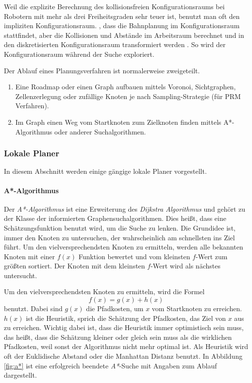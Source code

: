 Weil die explizite Berechnung des kollisionsfreien Konfigurationsraums bei Robotern mit mehr als drei Freiheitsgraden sehr teuer ist, benutzt man oft den impliziten Konfigurationsraum.
\Dh, dass die Bahnplanung im Konfigurationsraum stattfindet, aber die Kollisionen und Abstände im Arbeitsraum berechnet und in den diskretisierten Konfigurationsraum transformiert werden \citep{innoKonz}.
So wird der Konfigurationsraum während der Suche exploriert.

Der Ablauf eines Planungsverfahren ist normalerweise zweigeteilt\cite{Russell2003}.
\begin{enumerate}
\item Eine Roadmap oder einen Graph aufbauen mittels \gls{Voronoi},
 \gls{Sichtgraphen}, \gls{Zellenzerlegung} oder zufällige Knoten je nach
 Sampling-Strategie (\zB für \gls{PRM} Verfahren\cite{Thrun2005}).
\item Im Graph einen Weg vom Startknoten zum Zielknoten finden mittels A*-Algorithmus oder anderer Suchalgorithmen.
\end{enumerate}

\subsubsection{Lokale Planer}
\label{bahnplanung_lokale_planer_sec}

In diesem Abschnitt werden einige gängige lokale Planer vorgestellt.

\paragraph{A*-Algorithmus} 

Der \textit{A*-Algorithmus}\citep{Russell2003} ist eine Erweiterung des \textit{Dijkstra Algorithmus} und gehört zu der Klasse der informierten Graphensuchalgorithmen.
Dies heißt, dass eine Schätzungsfunktion benutzt wird, um die Suche zu lenken.
Die Grundidee ist, immer den Knoten zu untersuchen, der wahrscheinlich am schnellsten ins Ziel führt.
Um den vielversprechendsten Knoten zu ermitteln, werden alle bekannten Knoten mit einer $f(x)$ Funktion bewertet und vom kleinsten $f$-Wert zum größten sortiert.
Der Knoten mit dem kleinsten $f$-Wert wird als nächstes untersucht. 

Um den vielversprechendsten Knoten zu ermitteln, wird die Formel
\begin{equation}
 f(x) = g(x) + h(x)
\end{equation}
benutzt.
Dabei sind $g(x)$ die Pfadkosten, um $x$ vom Startknoten zu erreichen.
$h(x)$ ist die Heuristik, sprich die Schätzung der Pfadkosten, das Ziel von $x$ aus zu erreichen.
Wichtig dabei ist, dass die Heuristik immer optimistisch sein muss, das heißt, dass die Schätzung kleiner oder gleich sein muss als die wirklichen Pfadkosten, weil sonst der Algorithmus nicht mehr optimal ist.
Als Heuristik wird oft der Euklidische Abstand oder die Manhattan Distanz benutzt.
In Abbildung \ref{fig:a*} ist eine erfolgreich beendete \textit{A*}-Suche mit Angaben zum Ablauf dargestellt.

